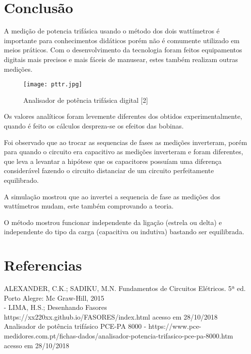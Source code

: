 \documentclass[a4paper, 12pt]{article}
\begin{document}
\newpage
\section{Conclusão}
\justifying
   A medição de potencia trifásica usando o método dos dois wattímetros é importante para conhecimentos didáticos porém não é comumente utilizado em meios práticos. Com o desenvolvimento da tecnologia foram feitos equipamentos digitais mais precisos e mais fáceis de manusear, estes também realizam outras medições.
   \begin{figure}[H]
            \centering %
           \texttt{[image: pttr.jpg]}
            \caption{Analisador de potência trifásica digital [2]}
    \end{figure}

    Os valores analíticos foram levemente diferentes dos obtidos experimentalmente, quando é feito os cálculos despreza-se os efeitos das bobinas.

    Foi observado que ao trocar as sequencias de fases as medições inverteram, porém para quando o circuito era capacitivo as medições inverteram e  foram diferentes, que leva a levantar a hipótese que os capacitores possuíam uma diferença considerável  fazendo o circuito distanciar de um circuito perfeitamente equilibrado.

    A simulação mostrou que ao invertei a sequencia de fase as medições dos wattímetros mudam, este também comprovando a teoria.

    O método mostrou funcionar independente da ligação (estrela ou delta) e independente do tipo da carga (capacitiva ou indutiva) bastando ser equilibrada.

\newpage
\section*{Referencias}
\justifying
\noindent
ALEXANDER, C.K.; SADIKU, M.N. Fundamentos de Circuitos Elétricos. 5ª ed.
Porto Alegre: Mc Graw-Hill, 2015\\

\noindent
[1] - LIMA, H.S.; Desenhando Fasores https://xx220xx.github.io/FASORES/index.html acesso em 28/10/2018 \\

\noindent
[2] Analisador de potência trifásico PCE-PA 8000 - https://www.pce-medidores.com.pt/fichas-dados/analisador-potencia-trifasico-pce-pa-8000.htm acesso em 28/10/2018
\end{document}
